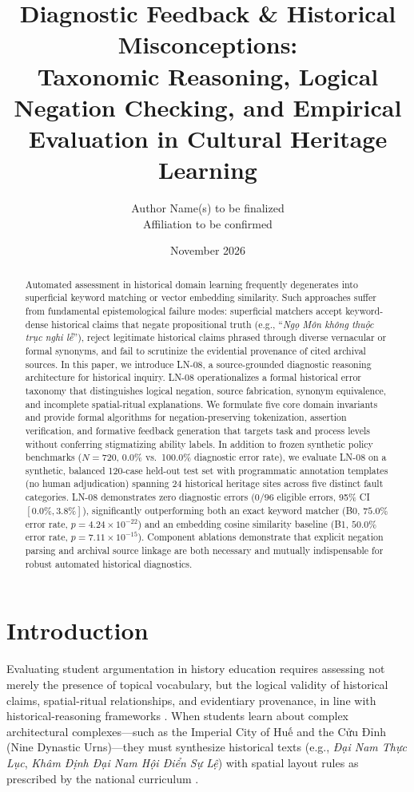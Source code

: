 \documentclass[11pt,a4paper]{article}
\title{Diagnostic Feedback \& Historical Misconceptions: \\ \large Taxonomic Reasoning, Logical Negation Checking, and Empirical Evaluation in Cultural Heritage Learning}
\author{Author Name(s) to be finalized \\ \small Affiliation to be confirmed}
\date{November 2026}
\begin{document}
\maketitle

\begin{abstract}
Automated assessment in historical domain learning frequently degenerates into superficial keyword matching or vector embedding similarity. Such approaches suffer from fundamental epistemological failure modes: superficial matchers accept keyword-dense historical claims that negate propositional truth (e.g., ``\textit{Ngọ Môn không thuộc trục nghi lễ}''), reject legitimate historical claims phrased through diverse vernacular or formal synonyms, and fail to scrutinize the evidential provenance of cited archival sources. In this paper, we introduce LN-08, a source-grounded diagnostic reasoning architecture for historical inquiry. LN-08 operationalizes a formal historical error taxonomy that distinguishes logical negation, source fabrication, synonym equivalence, and incomplete spatial-ritual explanations. We formulate five core domain invariants and provide formal algorithms for negation-preserving tokenization, assertion verification, and formative feedback generation that targets task and process levels without conferring stigmatizing ability labels. In addition to frozen synthetic policy benchmarks ($N=720$, 0.0\% vs.\ 100.0\% diagnostic error rate), we evaluate LN-08 on a synthetic, balanced 120-case held-out test set with programmatic annotation templates (no human adjudication) spanning 24 historical heritage sites across five distinct fault categories. LN-08 demonstrates zero diagnostic errors ($0/96$ eligible errors, 95\% CI $[0.0\%, 3.8\%]$), significantly outperforming both an exact keyword matcher (B0, $75.0\%$ error rate, $p = 4.24 \times 10^{-22}$) and an embedding cosine similarity baseline (B1, $50.0\%$ error rate, $p = 7.11 \times 10^{-15}$). Component ablations demonstrate that explicit negation parsing and archival source linkage are both necessary and mutually indispensable for robust automated historical diagnostics.
\end{abstract}

\section{Introduction}
Evaluating student argumentation in history education requires assessing not merely the presence of topical vocabulary, but the logical validity of historical claims, spatial-ritual relationships, and evidentiary provenance, in line with historical-reasoning frameworks \cite{wineburg2001historical, van2008historical, seixas2013big}. When students learn about complex architectural complexes—such as the Imperial City of Huế and the Cửu Đỉnh (Nine Dynastic Urns)—they must synthesize historical texts (e.g., \textit{Đại Nam Thực Lục}, \textit{Khâm Định Đại Nam Hội Điển Sự Lệ}) with spatial layout rules as prescribed by the national curriculum \cite{moet2018gdpt}.
\end{document}
